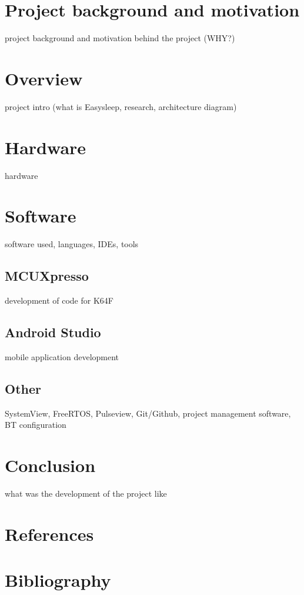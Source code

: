 \documentclass[12pt,a4paper]{article}
\begin{document}
	\section{Project background and motivation}
	project background and motivation behind the project (WHY?)
	\newpage
	
	\section{Overview}
	project intro (what is Easysleep, research, architecture diagram)
	\newpage
	
	\section{Hardware}
	hardware
	\newpage
	
	\section{Software}
	software used, languages, IDEs, tools
	
		\subsection{MCUXpresso}
		development of code for K64F
		\newpage
	
		\subsection{Android Studio}
		mobile application development
		\newpage
		
		\subsection{Other}
		SystemView, FreeRTOS, Pulseview, Git/Github, project management software, BT configuration
		\newpage
	
	\section{Conclusion}
	what was the development of the project like
	\newpage
	
	\section{References}
	\newpage
	
	\section{Bibliography}
	\newpage
	
\end{document}
